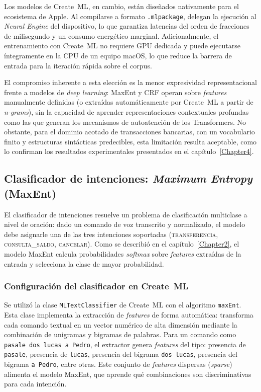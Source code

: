 Los modelos de Create~ML, en cambio, están diseñados nativamente para el ecosistema de Apple. Al compilarse a formato \lstinline|.mlpackage|, delegan la ejecución al \textit{Neural Engine} del dispositivo, lo que garantiza latencias del orden de fracciones de milisegundo y un consumo energético marginal. Adicionalmente, el entrenamiento con Create~ML no requiere GPU dedicada y puede ejecutarse íntegramente en la CPU de un equipo macOS, lo que reduce la barrera de entrada para la iteración rápida sobre el corpus.

El compromiso inherente a esta elección es la menor expresividad representacional frente a modelos de \textit{deep learning}: MaxEnt y CRF operan sobre \textit{features} manualmente definidas (o extraídas automáticamente por Create~ML a partir de \textit{n-grams}), sin la capacidad de aprender representaciones contextuales profundas como las que generan los mecanismos de autoatención de los Transformers. No obstante, para el dominio acotado de transacciones bancarias, con un vocabulario finito y estructuras sintácticas predecibles, esta limitación resulta aceptable, como lo confirman los resultados experimentales presentados en el capítulo~\ref{Chapter4}.

\subsection{Clasificador de intenciones: \textit{Maximum Entropy} (MaxEnt)}
\label{subsec:maxent}

El clasificador de intenciones resuelve un problema de clasificación multiclase a nivel de oración: dado un comando de voz transcrito y normalizado, el modelo debe asignarle una de las tres intenciones soportadas (\textsc{transferencia}, \textsc{consulta\_saldo}, \textsc{cancelar}). Como se describió en el capítulo~\ref{Chapter2}, el modelo MaxEnt \citep{berger1996maximum} calcula probabilidades \textit{softmax} sobre \textit{features} extraídas de la entrada y selecciona la clase de mayor probabilidad.

\subsubsection{Configuración del clasificador en Create~ML}

Se utilizó la clase \texttt{MLText\-Classifier} de Create~ML con el algoritmo \texttt{maxEnt}. Esta clase implementa la extracción de \textit{features} de forma automática: transforma cada comando textual en un vector numérico de alta dimensión mediante la combinación de unigramas y bigramas de palabras. Para un comando como \texttt{pasale dos lucas a Pedro}, el extractor genera \textit{features} del tipo: presencia de \texttt{pasale}, presencia de \texttt{lucas}, presencia del bigrama \texttt{dos lucas}, presencia del bigrama \texttt{a Pedro}, entre otras. Este conjunto de \textit{features} dispersas (\textit{sparse}) alimenta el modelo MaxEnt, que aprende qué combinaciones son discriminativas para cada intención.

